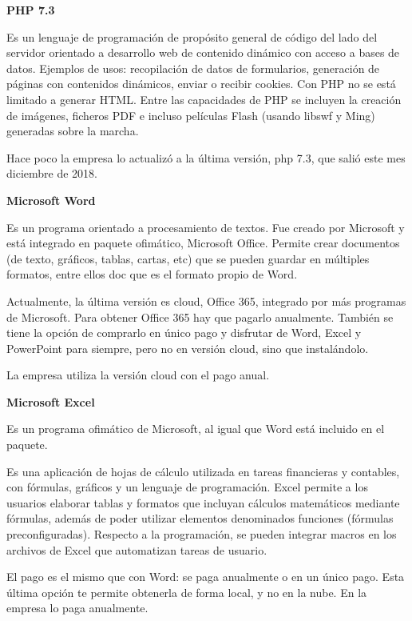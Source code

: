 \documentclass{article}
\begin{document}
\vspace{5mm}

\textbf{PHP 7.3}

Es un lenguaje de programación de propósito general de código del lado del servidor orientado a desarrollo web de contenido dinámico con acceso a bases de datos.  Ejemplos de usos: recopilación de datos de formularios, generación de páginas con contenidos dinámicos, enviar o recibir cookies. Con PHP no se está limitado a generar HTML. Entre las capacidades de PHP se incluyen la creación de imágenes, ficheros PDF e incluso películas Flash (usando libswf y Ming) generadas sobre la marcha. 

Hace poco la empresa lo actualizó a la última versión, php 7.3, que salió este mes diciembre de 2018.

\vspace{5mm}

\textbf{Microsoft Word}

Es un programa orientado a procesamiento de textos. Fue creado por Microsoft y está integrado en paquete ofimático, Microsoft Office. Permite crear documentos (de texto, gráficos, tablas, cartas, etc) que se pueden guardar en múltiples formatos, entre ellos doc que es el formato propio de Word.  

Actualmente, la última versión es cloud, Office 365, integrado por más programas de Microsoft. Para obtener Office 365 hay que pagarlo anualmente.  También se tiene la opción de comprarlo en único pago y disfrutar de Word, Excel y PowerPoint para siempre, pero no en versión cloud, sino que instalándolo.   

La empresa utiliza la versión cloud con el pago anual.  

\vspace{5mm}

\textbf{Microsoft Excel}

Es un programa ofimático de Microsoft, al igual que Word está incluido en el paquete.  

Es una aplicación de hojas de cálculo utilizada en tareas financieras y contables, con fórmulas, gráficos y un lenguaje de programación. Excel permite a los usuarios elaborar tablas y formatos que incluyan cálculos matemáticos mediante fórmulas, además de poder utilizar elementos denominados funciones (fórmulas preconfiguradas). Respecto a la programación, se pueden integrar macros en los archivos de Excel que automatizan tareas de usuario.  

El pago es el mismo que con Word: se paga anualmente o en un único pago. Esta última opción te permite obtenerla de forma local, y no en la nube. En la empresa lo paga anualmente. 
\end{document}
